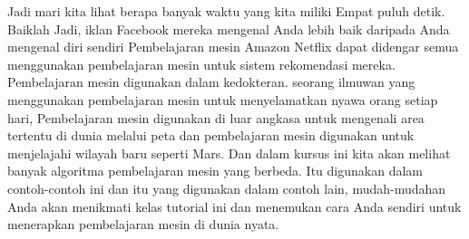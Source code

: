 Jadi mari kita lihat berapa banyak waktu yang kita miliki Empat puluh detik. Baiklah Jadi, iklan Facebook mereka mengenal Anda lebih baik daripada Anda mengenal diri sendiri Pembelajaran mesin Amazon Netflix dapat didengar semua menggunakan pembelajaran mesin untuk sistem rekomendasi mereka. Pembelajaran mesin digunakan dalam kedokteran. seorang ilmuwan yang menggunakan pembelajaran mesin untuk menyelamatkan nyawa orang setiap hari, Pembelajaran mesin digunakan di luar angkasa untuk mengenali area tertentu di dunia melalui peta dan pembelajaran mesin digunakan untuk menjelajahi wilayah baru seperti Mars.  Dan dalam kursus ini kita akan melihat banyak algoritma pembelajaran mesin yang berbeda. Itu digunakan dalam contoh-contoh ini dan itu yang digunakan dalam contoh lain, mudah-mudahan Anda akan menikmati kelas tutorial ini dan menemukan cara Anda sendiri untuk menerapkan pembelajaran mesin di dunia nyata.
